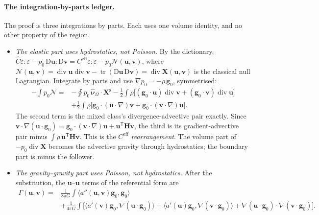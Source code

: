 \documentclass[11pt]{article}
\theoremstyle{definition}
\theoremstyle{remark}
\newcommand{\bu}{\mathbf{u}}
\newcommand{\bv}{\mathbf{v}}
\newcommand{\Div}{\operatorname{div}}
\newcommand{\nuho}{\hat{\boldsymbol{\nu}}_\Omega}
\begin{document}
\paragraph{The integration-by-parts ledger.} The proof is three
integrations by parts. Each uses one volume identity, and no other
property of the region.
\begin{itemize}
\item \emph{The elastic part uses hydrostatics, not Poisson.} By the
  dictionary, $\hat C\varepsilon:\varepsilon - p_0\,\mathrm D\bu:
  \mathrm D\bv = C^{\mathrm{eff}}\varepsilon:\varepsilon -
  p_0\mathcal N(\bu, \bv)$, where $\mathcal N(\bu, \bv) =
  \Div\bu\Div\bv - \operatorname{tr}(\mathrm D\bu\,\mathrm D\bv) =
  \Div\mathbf X(\bu, \bv)$ is the classical null Lagrangian. Integrate
  by parts and use $\nabla p_0 = -\rho\,\mathbf g_0$, symmetrised:
  \begin{equation*}
  \begin{aligned}
    -\int p_0\mathcal N
    ={}& -\oint p_0\,\nuho\cdot\mathbf X^{\mathrm s}
      - \tfrac12\int\rho\bigl[(\mathbf g_0\cdot\bu)\Div\bv
         + (\mathbf g_0\cdot\bv)\Div\bu\bigr] \\
      &+ \tfrac12\int\rho\bigl[\mathbf g_0\cdot(\bu\cdot\nabla)\bv
         + \mathbf g_0\cdot(\bv\cdot\nabla)\bu\bigr] .
  \end{aligned}
  \end{equation*}
  The second term is the mixed class's divergence-advective pair
  exactly. Since $\bv\cdot\nabla(\bu\cdot\mathbf g_0) = \mathbf
  g_0\cdot(\bv\cdot\nabla)\bu + \bu^{\mathsf T}\mathbf H\bv$, the third
  is its gradient-advective pair minus $\int\rho\,\bu^{\mathsf T}
  \mathbf H\bv$. This is the \emph{$C^{\mathrm{eff}}$ rearrangement}.
  The volume part of $-p_0\Div\mathbf X$ becomes the advective gravity
  through hydrostatics; the boundary part is minus the follower.
\item \emph{The gravity--gravity part uses Poisson, not hydrostatics.}
  After the substitution, the $\bu$--$\bu$ terms of the referential
  form are
  \begin{equation*}
  \begin{aligned}
    \Gamma(\bu, \bv) ={}& \frac{1}{8\pi G}\int\langle a''(\bu, \bv)
    \mathbf g_0, \mathbf g_0\rangle \\
    &+ \frac{1}{4\pi G}\int\bigl[\langle a'(\bv)\mathbf g_0,
    \nabla(\bu\cdot\mathbf g_0)\rangle + \langle a'(\bu)\mathbf g_0,
    \nabla(\bv\cdot\mathbf g_0)\rangle + \nabla(\bu\cdot\mathbf
    g_0)\cdot\nabla(\bv\cdot\mathbf g_0)\bigr] .

\end{aligned}
\end{equation*}
\end{itemize}
\end{document}
